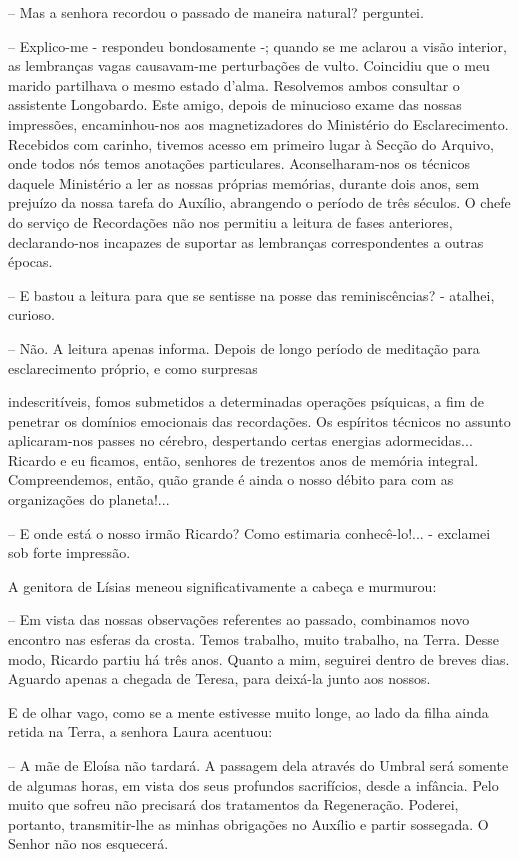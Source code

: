 \documentclass[portuguese,12pt,a4paper]{scrbook}
\begin{document}
	– Mas a senhora recordou o passado de maneira natural? perguntei.
	
	– Explico-me - respondeu bondosamente -; quando se me aclarou a visão interior, as lembranças vagas causavam-me perturbações de vulto. Coincidiu que o meu marido partilhava o mesmo estado d’alma. Resolvemos ambos consultar o assistente Longobardo. Este amigo, depois de minucioso exame das nossas impressões, encaminhou-nos aos magnetizadores do Ministério do Esclarecimento. Recebidos com carinho, tivemos acesso em primeiro lugar à Secção do Arquivo, onde todos nós temos anotações particulares. Aconselharam-nos os técnicos daquele Ministério a ler as nossas próprias memórias, durante dois anos, sem prejuízo da nossa tarefa do Auxílio, abrangendo o período de três séculos. O chefe do serviço de Recordações não nos permitiu a leitura de fases anteriores, declarando-nos incapazes de suportar as lembranças correspondentes a outras épocas.
	
	– E bastou a leitura para que se sentisse na posse das reminiscências? - atalhei, curioso.
	
	– Não. A leitura apenas informa. Depois de longo período de meditação para esclarecimento próprio, e como surpresas
	
	
	indescritíveis, fomos submetidos a determinadas operações psíquicas, a fim de penetrar os domínios emocionais das recordações. Os espíritos técnicos no assunto aplicaram-nos passes no cérebro, despertando certas energias adormecidas... Ricardo e eu ficamos, então, senhores de trezentos anos de memória integral. Compreendemos, então, quão grande é ainda o nosso débito para com as organizações do planeta!...
	
	– E onde está o nosso irmão Ricardo? Como estimaria conhecê-lo!... - exclamei sob forte impressão.
	
	A genitora de Lísias meneou significativamente a cabeça e murmurou:
	
	– Em vista das nossas observações referentes ao passado, combinamos novo encontro nas esferas da crosta. Temos trabalho, muito trabalho, na Terra. Desse modo, Ricardo partiu há três anos. Quanto a mim, seguirei dentro de breves dias. Aguardo apenas a chegada de Teresa, para deixá-la junto aos nossos.
	
	E de olhar vago, como se a mente estivesse muito longe, ao lado da filha ainda retida na Terra, a senhora Laura acentuou:
	
	– A mãe de Eloísa não tardará. A passagem dela através do Umbral será somente de algumas horas, em vista dos seus profundos sacrifícios, desde a infância. Pelo muito que sofreu não precisará dos tratamentos da Regeneração. Poderei, portanto, transmitir-lhe as minhas obrigações no Auxílio e partir sossegada. O Senhor não nos esquecerá.
	
\end{document}
